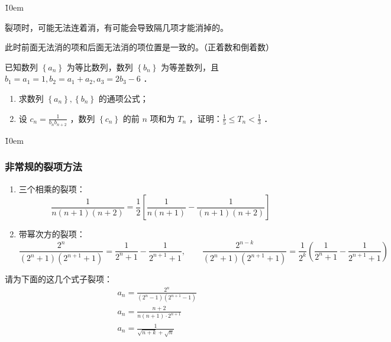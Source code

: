 \v{10em}

\begin{theorem}[隔项相消的裂项]
    裂项时，可能无法连着消，有可能会导致隔几项才能消掉的。
    \begin{tips}
        此时前面无法消的项和后面无法消的项位置是一致的。（正着数和倒着数）
    \end{tips}
\end{theorem}

\begin{example}
    已知数列 $\left\{a_n\right\}$ 为等比数列，数列 $\left\{b_n\right\}$ 为等差数列，且 $b_1=a_1=1, b_2=a_1+a_2, a_3=2 b_3-6$ ．
    \begin{enumerate}
        \item 求数列 $\left\{a_n\right\},\left\{b_n\right\}$ 的通项公式；

        \item 设 $c_n=\frac{1}{b_n b_{n+2}}$ ，数列 $\left\{c_n\right\}$ 的前 $n$ 项和为 $T_n$ ，证明：$\frac{1}{5} \leq T_n<\frac{1}{3}$ ．
    \end{enumerate}
\end{example}

\v{10em}



\subsubsection{非常规的裂项方法}

\begin{theorem}[非常规的裂项方法]
    \begin{enumerate}
        \item 三个相乘的裂项：$$\frac{1}{n(n+1)(n+2)}=\frac{1}{2}\left[\frac{1}{n(n+1)}-\frac{1}{(n+1)(n+2)}\right]$$
        \item 带幂次方的裂项：$$\frac{2^n}{\left(2^n+1\right)\left(2^{n+1}+1\right)}=\frac{1}{2^n+1}-\frac{1}{2^{n+1}+1}, \quad \quad \frac{2^{n-k}}{\left(2^n+1\right)\left(2^{n+1}+1\right)}=\frac{1}{2^k}\left(\frac{1}{2^n+1}-\frac{1}{2^{n+1}+1}\right)$$
    \end{enumerate}
\end{theorem}

\begin{example}
    请为下面的这几个式子裂项：
    $$
        \begin{aligned}
             & a_n=\frac{2^n}{\left(2^n-1\right)\left(2^{n+1}-1\right)} \\
             & a_n=\frac{n+2}{n(n+1) \cdot 2^{n+1}}                     \\
             & a_n=\frac{1}{\sqrt{n+k}+\sqrt{n}}
        \end{aligned}
    $$
\end{example}

